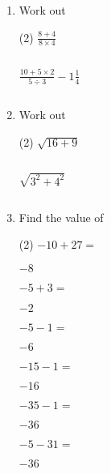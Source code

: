 \begin{enumerate} [leftmargin=0cm]
\item Work out
\begin{tasks}[label=(\alph*), after-item-skip=2pt,after-skip=3pt, label-width=4ex](2)
    \task  $ \frac{8+4}{8 \times 4}                              $                  \\  \begin{envAnswer}[blankline=3]        $       $ \end{envAnswer}
    \task  $ \frac{10+5 \times 2}{5 \div 3} - 1 \frac{1}{4}      $                  \\  \begin{envAnswer}[blankline=3]        $       $ \end{envAnswer}
\end{tasks}

\item Work out
\begin{tasks}[label=(\alph*), after-item-skip=2pt,after-skip=3pt, label-width=4ex](2)
    \task  $ \sqrt{16+9}                                         $                  \\  \begin{envAnswer}[blankline=5]        $       $ \end{envAnswer}
    \task  $ \sqrt{3^2 + 4^2}                                    $                  \\  \begin{envAnswer}[blankline=5]        $       $ \end{envAnswer}
\end{tasks}



\item   Find the value of              
 \begin{tasks}[label=(\alph*), after-item-skip=2pt,after-skip=3pt, label-width=4ex](2)               
  \task $-10+27 =$        \begin{envFillIn}$     -8  $ \end{envFillIn}
  \task $ -5+3 = $        \begin{envFillIn}$     -2  $ \end{envFillIn}
  \task $ -5-1 =$        \begin{envFillIn}$     -6  $ \end{envFillIn}
  \task $ -15-1 = $        \begin{envFillIn}$     -16  $ \end{envFillIn}
  \task $ -35-1 = $        \begin{envFillIn}$     -36  $ \end{envFillIn}
  \task $ -5-31 = $        \begin{envFillIn}$     -36  $ \end{envFillIn}
 \end{tasks}               


\end{enumerate}

